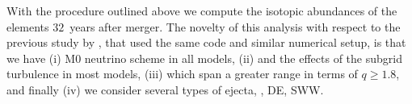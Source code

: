 With the procedure outlined above we compute the isotopic abundances of 
the \rproc{} elements $32$~years after merger. 
The novelty of this analysis with respect to the previous study by 
\citep{Radice:2016dwd,Radice:2018pdn}, that used the same code and similar 
numerical setup, is that we have 
%
(i) M0 neutrino scheme in all models, 
%
(ii) and the effects of the subgrid turbulence in most models, 
(iii) which span a greater range in terms of \mr{} $q\geq1.8$,
and finally (iv) we consider several types of ejecta, \eg, \ac{DE}, \ac{SWW}.



